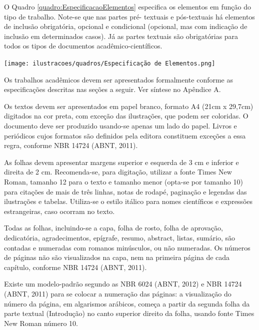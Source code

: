\begin{Desenvolvimento}
O Quadro \ref{quadro:EspecificacaoElementos} especifica os elementos em função do tipo de trabalho. Note-se que nas partes pré- textuais e pós-textuais há elementos de inclusão obrigatória, opcional e condicional (opcional, mas com indicação de inclusão em determinados casos). Já as partes textuais são obrigatórias para todos os tipos de documentos acadêmico-científicos.

\begin{quadro} [h!]
  \centering
  \addquadro
  \texttt{[image: ilustracoes/quadros/Especificação de Elementos.png]}
  \label{quadro:EspecificacaoElementos}
\end{quadro}

Os trabalhos acadêmicos devem ser apresentados formalmente conforme as especificações descritas nas seções a seguir. Ver síntese no Apêndice A.

Os textos devem ser apresentados em papel branco, formato A4 (21cm x 29,7cm) digitados na cor preta, com exceção das ilustrações, que podem ser coloridas. O documento deve ser produzido usando-se apenas um lado do papel. Livros e periódicos cujos formatos são definidos pela editora constituem exceções a essa regra, conforme NBR 14724 (ABNT, 2011).

As folhas devem apresentar margens superior e esquerda de 3 cm e inferior e direita de 2 cm. Recomenda-se, para digitação, utilizar a fonte Times New Roman, tamanho 12 para o texto e tamanho menor (opta-se por tamanho 10) para citações de mais de três linhas, notas de rodapé, paginação e legendas das ilustrações e tabelas. Utiliza-se o estilo itálico para nomes científicos e expressões estrangeiras, caso ocorram no texto.

Todas as folhas, incluindo-se a capa, folha de rosto, folha de aprovação, dedicatória, agradecimentos, epígrafe, resumo, abstract, listas, sumário, são contadas e numeradas com romanos minúsculos, ou não numeradas. Os números de páginas não são visualizados na capa, nem na primeira página de cada capítulo, conforme NBR 14724 (ABNT, 2011).

Existe um modelo-padrão segundo as NBR 6024 (ABNT, 2012) e NBR 14724 (ABNT, 2011) para se colocar a numeração das páginas: a visualização do número da página, em algarismos arábicos, começa a partir da segunda folha da parte textual (Introdução) no canto superior direito da folha, usando fonte Times New Roman número 10.


\end{Desenvolvimento}
